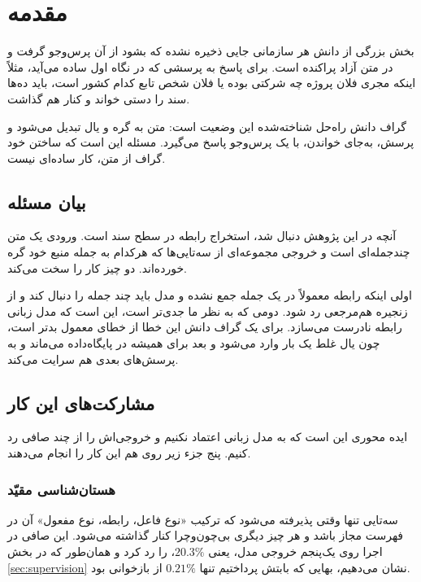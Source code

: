 \chapter{مقدمه}
\label{ch:intro}

بخش بزرگی از دانش هر سازمانی جایی ذخیره نشده که بشود از آن پرس‌وجو گرفت و در متن آزاد پراکنده است. برای پاسخ به پرسشی که در نگاه اول ساده می‌آید، مثلاً اینکه مجری فلان پروژه چه شرکتی بوده یا فلان شخص تابع کدام کشور است، باید ده‌ها سند را دستی خواند و کنار هم گذاشت.

گراف دانش راه‌حل شناخته‌شده این وضعیت است: متن به گره و یال تبدیل می‌شود و پرسش، به‌جای خواندن، با یک پرس‌وجو پاسخ می‌گیرد. مسئله این است که ساختن خود گراف از متن، کار ساده‌ای نیست.

\section{بیان مسئله}
\label{sec:problem}

آنچه در این پژوهش دنبال شد، استخراج رابطه در سطح سند است. ورودی یک متن چندجمله‌ای است و خروجی مجموعه‌ای از سه‌تایی‌ها که هرکدام به جمله منبع خود گره خورده‌اند. دو چیز کار را سخت می‌کند.

اولی اینکه رابطه معمولاً در یک جمله جمع نشده و مدل باید چند جمله را دنبال کند و از زنجیره هم‌مرجعی رد شود. دومی که به نظر ما جدی‌تر است، این است که مدل زبانی رابطه نادرست می‌سازد. برای یک گراف دانش این خطا از خطای معمول بدتر است، چون یال غلط یک بار وارد می‌شود و بعد برای همیشه در پایگاه‌داده می‌ماند و به پرسش‌های بعدی هم سرایت می‌کند.

\section{مشارکت‌های این کار}
\label{sec:contributions}

ایده محوری این است که به مدل زبانی اعتماد نکنیم و خروجی‌اش را از چند صافی رد کنیم. پنج جزء زیر روی هم این کار را انجام می‌دهند.

\subsection{هستان‌شناسی مقیّد}
\label{sec:c-ontology}

سه‌تایی تنها وقتی پذیرفته می‌شود که ترکیب «نوع فاعل، رابطه، نوع مفعول» آن در فهرست مجاز باشد و هر چیز دیگری بی‌چون‌وچرا کنار گذاشته می‌شود. این صافی در اجرا روی  یک‌پنجم خروجی مدل، یعنی $20.3\%$، را رد کرد و همان‌طور که در بخش \ref{sec:supervision} نشان می‌دهیم، بهایی که بابتش پرداختیم تنها $0.21\%$ از بازخوانی بود.

